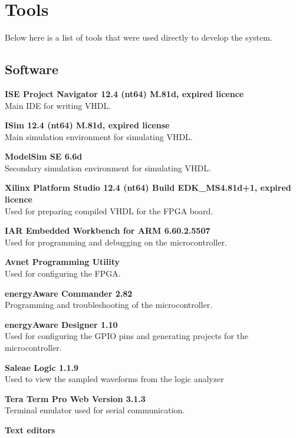 \section{Tools}
Below here is a list of tools that were used directly to develop the system.

\subsection{Software}
\begin{description}
    \item{\textbf{ISE Project Navigator 12.4 (nt64) M.81d, expired licence}} \\
        Main IDE for writing VHDL.
    \item{\textbf{ISim 12.4 (nt64) M.81d, expired license}} \\
        Main simulation environment for simulating VHDL.
    \item{\textbf{ModelSim SE 6.6d}} \\
        Secondary simulation environment for simulating VHDL.
    \item{\textbf{Xilinx Platform Studio 12.4 (nt64) Build EDK\_MS4.81d+1, expired licence}} \\
        Used for preparing compiled VHDL for the FPGA board.
    \item{\textbf{IAR Embedded Workbench for ARM 6.60.2.5507}} \\
        Used for programming and debugging on the microcontroller.
    \item{\textbf{Avnet Programming Utility}} \\
        Used for configuring the FPGA.
    \item{\textbf{energyAware Commander 2.82}} \\
        Programming and troubleshooting of the microcontroller.
    \item{\textbf{energyAware Designer 1.10}} \\
        Used for configuring the GPIO pins and generating projects for the microcontroller.
    \item{\textbf{Saleae Logic 1.1.9}} \\
        Used to view the sampled waveforms from the logic analyzer
    \item{\textbf{Tera Term Pro Web Version 3.1.3}} \\
        Terminal emulator used for serial communication.
    \item{\textbf{Text editors}} \\

\end{description}
